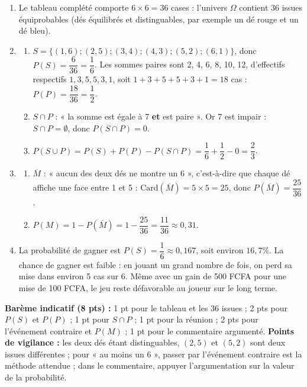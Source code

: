 \documentclass[11pt]{article}
\begin{document}
\begin{corrige}
\begin{enumerate}
\item Le tableau complété comporte $6 \times 6 = 36$ cases : l'univers $\Omega$ contient 36 issues équiprobables (dés équilibrés et distinguables, par exemple un dé rouge et un dé bleu).
\item 
\begin{enumerate}
\item $S = \{(1,6) ; (2,5) ; (3,4) ; (4,3) ; (5,2) ; (6,1)\}$, donc $P(S) = \dfrac{6}{36} = \dfrac{1}{6}$.
Les sommes paires sont 2, 4, 6, 8, 10, 12, d'effectifs respectifs $1, 3, 5, 5, 3, 1$, soit $1+3+5+5+3+1 = 18$ cas : $P(P) = \dfrac{18}{36} = \dfrac{1}{2}$.
\item $S \cap P$ : « la somme est égale à 7 \textbf{et} est paire ». Or 7 est impair : $S \cap P = \emptyset$, donc $P(S \cap P) = 0$.
\item $P(S \cup P) = P(S) + P(P) - P(S \cap P) = \dfrac{1}{6} + \dfrac{1}{2} - 0 = \dfrac{2}{3}$.
\end{enumerate}
\item 
\begin{enumerate}
\item $\overline{M}$ : « aucun des deux dés ne montre un 6 », c'est-à-dire que chaque dé affiche une face entre 1 et 5 : $\text{Card}(\overline{M}) = 5 \times 5 = 25$, donc $P(\overline{M}) = \dfrac{25}{36}$.
\item $P(M) = 1 - P(\overline{M}) = 1 - \dfrac{25}{36} = \dfrac{11}{36} \approx 0{,}31$.
\end{enumerate}
\item La probabilité de gagner est $P(S) = \dfrac{1}{6} \approx 0{,}167$, soit environ $16{,}7\%$. La chance de gagner est faible : en jouant un grand nombre de fois, on perd sa mise dans environ 5 cas sur 6. Même avec un gain de 500 FCFA pour une mise de 100 FCFA, le jeu reste défavorable au joueur sur le long terme.
\end{enumerate}
\textbf{Barème indicatif (8 pts) :} 1 pt pour le tableau et les 36 issues ; 2 pts pour $P(S)$ et $P(P)$ ; 1 pt pour $S \cap P$ ; 1 pt pour la réunion ; 2 pts pour l'événement contraire et $P(M)$ ; 1 pt pour le commentaire argumenté.
\textbf{Points de vigilance :} les deux dés étant distinguables, $(2,5)$ et $(5,2)$ sont deux issues différentes ; pour « au moins un 6 », passer par l'événement contraire est la méthode attendue ; dans le commentaire, appuyer l'argumentation sur la valeur de la probabilité.
\end{corrige}
\end{document}
